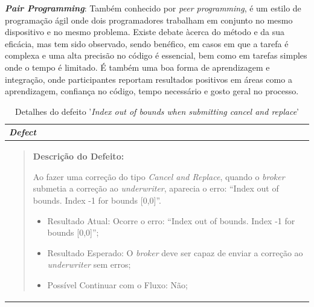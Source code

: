             \textbf{\textit{Pair Programming}}: Também conhecido por \textit{peer programming}, é um estilo de programação ágil onde dois programadores trabalham em conjunto no mesmo dispositivo e no mesmo problema\cite{peer-programming}. Existe debate àcerca do método e da sua eficácia, mas tem sido observado, sendo benéfico, em casos em que a tarefa é complexa e uma alta precisão no código é essencial, bem como em tarefas simples onde o tempo é limitado. É também uma boa forma de aprendizagem e integração, onde participantes reportam resultados positivos em áreas como a aprendizagem, confiança no código, tempo necessário e gosto geral no processo\cite{faja2014evaluating,hannay2009effectiveness}. %

            \begin{table}[htbp] %
                \centering
                \caption{Detalhes do defeito '\textit{Index out of bounds when submitting cancel and replace}'}\label{table:defect1}
                \begin{tabularx}{1\textwidth}{|>{\raggedright\arraybackslash}X|}
                    \hline
                    \rowcolor{lightgray}
                    \textbf{\textit{Defect}} \\
                    \hline
                    \rowcolor{lightgray!20}
                  
                    \begin{quote}
                        \textbf{Descrição do Defeito:}

                        Ao fazer uma correção do tipo \textit{Cancel and Replace}, quando o \textit{broker} submetia a correção ao \textit{underwriter}, aparecia o erro: ``Index out of bounds. Index -1 for bounds [0,0]''.
                        
                        \begin{itemize}
                            \item Resultado Atual: Ocorre o erro: ``Index out of bounds. Index -1 for bounds [0,0]'';

                            \item Resultado Esperado: O \textit{broker} deve ser capaz de enviar a correção ao \textit{underwriter} sem erros;

                            \item Possível Continuar com o Fluxo: Não;


\end{itemize}
\end{quote}
\end{tabularx}
\end{table}
